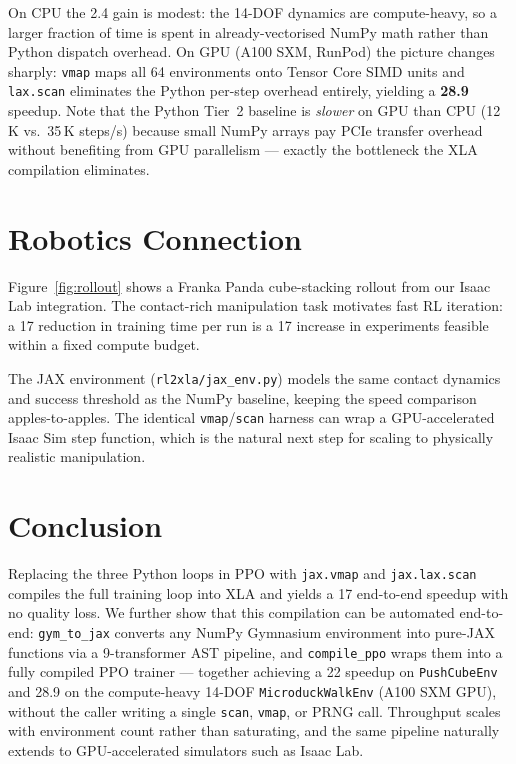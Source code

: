 \documentclass[11pt,twocolumn]{article}
\begin{document}
On CPU the 2.4\texttimes{} gain is modest: the 14-DOF dynamics are
compute-heavy, so a larger fraction of time is spent in already-vectorised
NumPy math rather than Python dispatch overhead.  On GPU (A100 SXM, RunPod)
the picture changes sharply: \texttt{vmap} maps all 64 environments onto
Tensor Core SIMD units and \texttt{lax.scan} eliminates the Python
per-step overhead entirely, yielding a \textbf{28.9\texttimes{}} speedup.
Note that the Python Tier~2 baseline is \emph{slower} on GPU than CPU
(12\,K vs.\ 35\,K steps/s) because small NumPy arrays pay PCIe transfer
overhead without benefiting from GPU parallelism — exactly the bottleneck
the XLA compilation eliminates.

\section{Robotics Connection}

Figure~\ref{fig:rollout} shows a Franka Panda cube-stacking rollout from our
Isaac Lab integration. The contact-rich manipulation task motivates fast RL
iteration: a 17\texttimes{} reduction in training time per run is a
17\texttimes{} increase in experiments feasible within a fixed compute budget.

The JAX environment (\texttt{rl2xla/jax\_env.py}) models the same contact
dynamics and success threshold as the NumPy baseline, keeping the speed
comparison apples-to-apples. The identical \texttt{vmap}/\texttt{scan}
harness can wrap a GPU-accelerated Isaac Sim step function, which is the
natural next step for scaling to physically realistic manipulation.

\section{Conclusion}

Replacing the three Python loops in PPO with \texttt{jax.vmap} and
\texttt{jax.lax.scan} compiles the full training loop into XLA and yields a
17\texttimes{} end-to-end speedup with no quality loss. We further show
that this compilation can be automated end-to-end: \texttt{gym\_to\_jax}
converts any NumPy Gymnasium environment into pure-JAX functions via a
9-transformer AST pipeline, and \texttt{compile\_ppo} wraps them into a
fully compiled PPO trainer — together achieving a 22\texttimes{} speedup on
\texttt{PushCubeEnv} and 28.9\texttimes{} on the compute-heavy 14-DOF
\texttt{MicroduckWalkEnv} (A100 SXM GPU), without the caller writing a single
\texttt{scan}, \texttt{vmap}, or PRNG call. Throughput scales with environment
count rather than saturating, and the same pipeline naturally extends to
GPU-accelerated simulators such as Isaac Lab.
\end{document}
